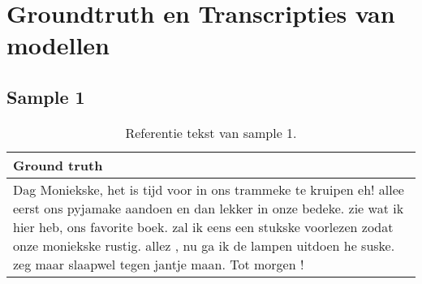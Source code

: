 \section{Groundtruth en Transcripties van modellen}


\subsection{Sample 1}

\begin{table}[htbp]
    \centering
    \label{tab:groundtruth_sample1}
    \begin{tabularx}{\textwidth}{|X|}
        \hline
            \textbf{Ground truth} \\
        \hline
            Dag Moniekske, het is tijd voor in ons trammeke te kruipen eh! allee eerst ons pyjamake aandoen en dan lekker in onze bedeke. zie wat ik hier heb, ons favorite boek. zal ik eens een stukske voorlezen zodat onze moniekske rustig. allez , nu ga ik de lampen uitdoen he suske. zeg maar slaapwel tegen jantje maan. Tot morgen ! \\
        \hline
    \end{tabularx}
    \caption{Referentie tekst van sample 1.} 
\end{table}

